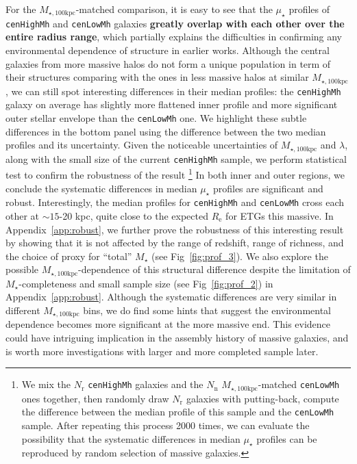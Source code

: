 \documentclass[a4paper,fleqn,usenatbib]{mnras}
\def\rbcg{\texttt{cenHighMh}}
\def\nbcg{\texttt{cenLowMh}}
\def\mstar{{$M_{\star}$}}
\def\mtot{{$M_{\star,100\mathrm{kpc}}$}}
\def\mden{{$\mu_{\star}$}}
\begin{document}
    For the \mtot{}-matched comparison, it is easy to see that the \mden{}
    profiles of \rbcg{} and \nbcg{} galaxies \textbf{greatly overlap with each 
    other over the entire radius range}, which partially explains the difficulties in 
    confirming any environmental dependence of structure in earlier works.
    Although the central galaxies from more massive halos do not form a unique 
    population in term of their structures comparing with the ones in less massive
    halos at similar \mtot{}, we can still spot interesting differences in their 
    median profiles: the \rbcg{} galaxy on average has slightly more flattened inner 
    profile and more significant outer stellar envelope than the \nbcg{} one.
    We highlight these subtle differences in the bottom panel using the difference 
    between the two median profiles and its uncertainty. 
    Given the noticeable uncertainties of \mtot{} and $\lambda$, along with the 
    small size of the current \rbcg{} sample, we perform statistical test to confirm 
    the robustness of the result \footnote{We mix the $N_{\mathrm{r}}$ \rbcg{} 
    galaxies and the $N_{\mathrm{n}}$ \mtot{}-matched \nbcg{} ones together, then 
    randomly draw $N_{\mathrm{r}}$ galaxies with putting-back, compute the difference 
    between the median profile of this sample and the \nbcg{} sample. 
    After repeating this process 2000 times, we can evaluate the possibility that 
    the systematic differences in median \mden{} profiles can be reproduced by random 
    selection of massive galaxies.}
    In both inner and outer regions, we conclude the systematic differences in 
    median \mden{} profiles are significant and robust.
    Interestingly, the median profiles for \rbcg{} and \nbcg{} cross each other 
    at $\sim 15$-20 kpc, quite close to the expected $R_{\mathrm{e}}$ for ETGs 
    this massive. 
    In Appendix~\ref{app:robust}, we further prove the robustness of this 
    interesting result by showing that it is not affected by the range of redshift,
    range of richness, and the choice of proxy for ``total'' \mstar{} 
    (see Fig~\ref{fig:prof_3}). 
    We also explore the possible \mtot{}-dependence of this structural difference 
    despite the limitation of \mstar{}-completeness and small sample size
    (see Fig~\ref{fig:prof_2}) in Appendix~\ref{app:robust}.
    Although the systematic differences are very similar in different \mtot{} bins, 
    we do find some hints that suggest the environmental dependence becomes more 
    significant at the more massive end.  
    This evidence could have intriguing implication in the assembly history of 
    massive galaxies, and is worth more investigations with larger and more completed 
    sample later.  
\end{document}
